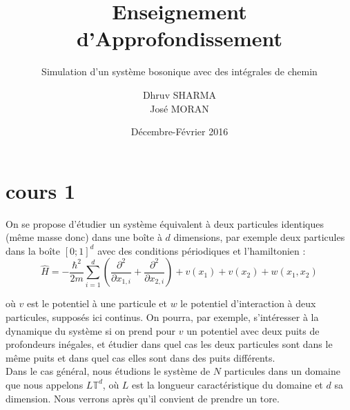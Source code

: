 \documentclass[11pt]{article}
\title{Enseignement d'Approfondissement}
\date{Décembre-Février 2016}
\author{Dhruv SHARMA \\ José MORAN}
\subtitle{Simulation d'un système bosonique avec des intégrales de chemin}
\newcommand{\hham}{\hat{H}}
\newcommand{\dom}{L\mathbb{T}^d}
\begin{document}
\maketitle

\section{cours 1}
On se propose d'étudier un système équivalent à deux particules identiques (même masse donc) dans une boîte à $d$ dimensions, par exemple deux particules dans la boîte $[0;1]^d$ avec des conditions périodiques et l'hamiltonien :
\begin{equation}
\hham = -\frac{\hbar^2}{2m}\sum_{i=1}^{d}\left( \frac{\partial^2}{\partial x_{1,i}}+\frac{\partial^2}{\partial x_{2,i}}\right)+v(x_1)+v(x_2)+w(x_1,x_2)
\end{equation}

où $v$ est le potentiel à une particule et $w$ le potentiel d'interaction à deux particules, supposés ici continus. On pourra, par exemple, s'intéresser à la dynamique du système si on prend pour $v$ un potentiel avec deux puits de profondeurs inégales, et étudier dans quel cas les deux particules sont dans le même puits et dans quel cas elles sont dans des puits différents.
\\

Dans le cas général, nous étudions le système de $N$ particules dans un domaine que nous appelons $\dom$, où $L$ est la longueur caractéristique du domaine et $d$ sa dimension. Nous verrons après qu'il convient de prendre un tore.
\\
\end{document}

